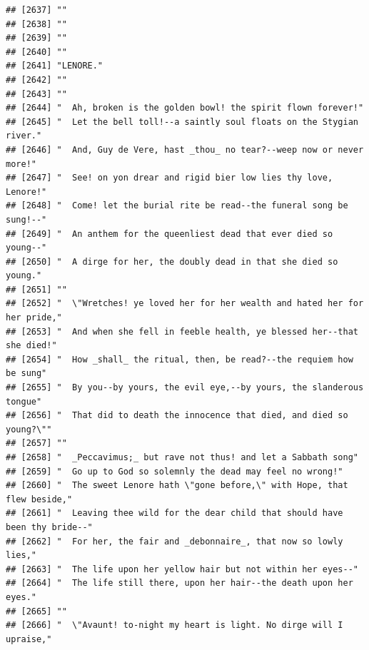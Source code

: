 \documentclass{article}\usepackage[]{graphicx}\usepackage[]{color}
\makeatletter
\newenvironment{kframe}{%
 \def\at@end@of@kframe{}%
 \ifinner\ifhmode%
  \def\at@end@of@kframe{\end{minipage}}%
  \begin{minipage}{\columnwidth}%
 \fi\fi%
 \def\FrameCommand##1{\hskip\@totalleftmargin \hskip-\fboxsep
 \colorbox{shadecolor}{##1}\hskip-\fboxsep
     \hskip-\linewidth \hskip-\@totalleftmargin \hskip\columnwidth}%
 \MakeFramed {\advance\hsize-\width
   \@totalleftmargin\z@ \linewidth\hsize
   \@setminipage}}%
 {\par\unskip\endMakeFramed%
 \at@end@of@kframe}
\newenvironment{knitrout}{}{} %
\makeatother
\begin{document}
\begin{knitrout}
\begin{kframe}
\begin{verbatim}
## [2637] ""                                                                            
## [2638] ""                                                                            
## [2639] ""                                                                            
## [2640] ""                                                                            
## [2641] "LENORE."                                                                     
## [2642] ""                                                                            
## [2643] ""                                                                            
## [2644] "  Ah, broken is the golden bowl! the spirit flown forever!"                  
## [2645] "  Let the bell toll!--a saintly soul floats on the Stygian river."           
## [2646] "  And, Guy de Vere, hast _thou_ no tear?--weep now or never more!"           
## [2647] "  See! on yon drear and rigid bier low lies thy love, Lenore!"               
## [2648] "  Come! let the burial rite be read--the funeral song be sung!--"            
## [2649] "  An anthem for the queenliest dead that ever died so young--"               
## [2650] "  A dirge for her, the doubly dead in that she died so young."               
## [2651] ""                                                                            
## [2652] "  \"Wretches! ye loved her for her wealth and hated her for her pride,"      
## [2653] "  And when she fell in feeble health, ye blessed her--that she died!"        
## [2654] "  How _shall_ the ritual, then, be read?--the requiem how be sung"           
## [2655] "  By you--by yours, the evil eye,--by yours, the slanderous tongue"          
## [2656] "  That did to death the innocence that died, and died so young?\""           
## [2657] ""                                                                            
## [2658] "  _Peccavimus;_ but rave not thus! and let a Sabbath song"                   
## [2659] "  Go up to God so solemnly the dead may feel no wrong!"                      
## [2660] "  The sweet Lenore hath \"gone before,\" with Hope, that flew beside,"       
## [2661] "  Leaving thee wild for the dear child that should have been thy bride--"    
## [2662] "  For her, the fair and _debonnaire_, that now so lowly lies,"               
## [2663] "  The life upon her yellow hair but not within her eyes--"                   
## [2664] "  The life still there, upon her hair--the death upon her eyes."             
## [2665] ""                                                                            
## [2666] "  \"Avaunt! to-night my heart is light. No dirge will I upraise,"            

\end{verbatim}
\end{kframe}
\end{knitrout}
\end{document}

